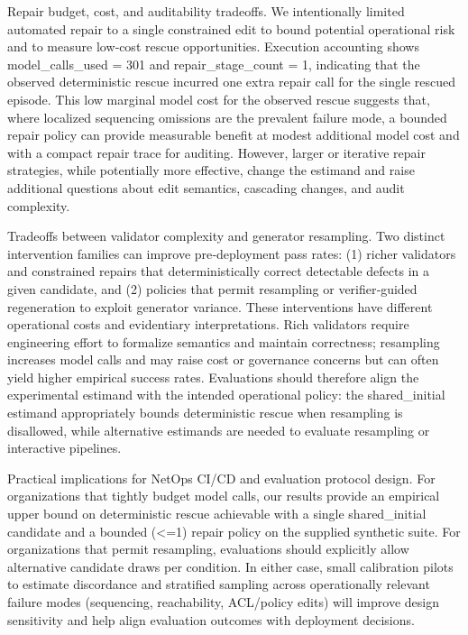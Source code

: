 \documentclass[conference]{IEEEtran}
\begin{document}
Repair budget, cost, and auditability tradeoffs. We intentionally limited automated repair to a single constrained edit to bound potential operational risk and to measure low‑cost rescue opportunities. Execution accounting shows model\_calls\_used = 301 and repair\_stage\_count = 1, indicating that the observed deterministic rescue incurred one extra repair call for the single rescued episode. This low marginal model cost for the observed rescue suggests that, where localized sequencing omissions are the prevalent failure mode, a bounded repair policy can provide measurable benefit at modest additional model cost and with a compact repair trace for auditing. However, larger or iterative repair strategies, while potentially more effective, change the estimand and raise additional questions about edit semantics, cascading changes, and audit complexity.

Tradeoffs between validator complexity and generator resampling. Two distinct intervention families can improve pre‑deployment pass rates: (1) richer validators and constrained repairs that deterministically correct detectable defects in a given candidate, and (2) policies that permit resampling or verifier‑guided regeneration to exploit generator variance. These interventions have different operational costs and evidentiary interpretations. Rich validators require engineering effort to formalize semantics and maintain correctness; resampling increases model calls and may raise cost or governance concerns but can often yield higher empirical success rates. Evaluations should therefore align the experimental estimand with the intended operational policy: the shared\_initial estimand appropriately bounds deterministic rescue when resampling is disallowed, while alternative estimands are needed to evaluate resampling or interactive pipelines.

Practical implications for NetOps CI/CD and evaluation protocol design. For organizations that tightly budget model calls, our results provide an empirical upper bound on deterministic rescue achievable with a single shared\_initial candidate and a bounded (<=1) repair policy on the supplied synthetic suite. For organizations that permit resampling, evaluations should explicitly allow alternative candidate draws per condition. In either case, small calibration pilots to estimate discordance and stratified sampling across operationally relevant failure modes (sequencing, reachability, ACL/policy edits) will improve design sensitivity and help align evaluation outcomes with deployment decisions.
\end{document}

